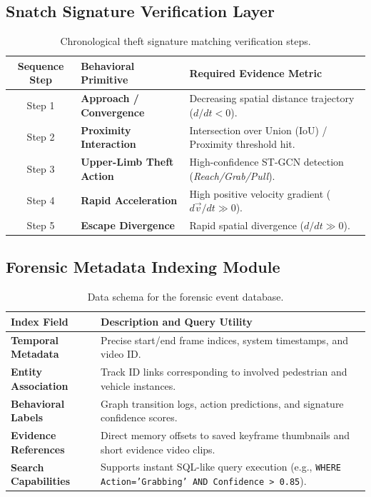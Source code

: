 \documentclass[11pt, a4paper]{article}
\begin{document}
\subsection{Snatch Signature Verification Layer}
\begin{table}[H]
\centering
\small
\renewcommand{\arraystretch}{1.3}
\begin{tabularx}{\textwidth}{|c|>{\hsize=0.35\hsize\bfseries}X|>{\hsize=0.55\hsize}X|}
\hline
\textbf{Sequence Step} & \textbf{Behavioral Primitive} & \textbf{Required Evidence Metric} \\
\hline
Step 1 & Approach / Convergence & Decreasing spatial distance trajectory ($d/dt < 0$). \\
\hline
Step 2 & Proximity Interaction & Intersection over Union (IoU) / Proximity threshold hit. \\
\hline
Step 3 & Upper-Limb Theft Action & High-confidence ST-GCN detection (\textit{Reach/Grab/Pull}). \\
\hline
Step 4 & Rapid Acceleration & High positive velocity gradient ($d\vec{v}/dt \gg 0$). \\
\hline
Step 5 & Escape Divergence & Rapid spatial divergence ($d/dt \gg 0$). \\
\hline
\end{tabularx}
\caption{Chronological theft signature matching verification steps.}
\end{table}

\subsection{Forensic Metadata Indexing Module}
\begin{table}[H]
\centering
\small
\renewcommand{\arraystretch}{1.3}
\begin{tabularx}{\textwidth}{|>{\hsize=0.3\hsize\bfseries}X|>{\hsize=0.7\hsize}X|}
\hline
\textbf{Index Field} & \textbf{Description and Query Utility} \\
\hline
Temporal Metadata & Precise start/end frame indices, system timestamps, and video ID. \\
\hline
Entity Association & Track ID links corresponding to involved pedestrian and vehicle instances. \\
\hline
Behavioral Labels & Graph transition logs, action predictions, and signature confidence scores. \\
\hline
Evidence References & Direct memory offsets to saved keyframe thumbnails and short evidence video clips. \\
\hline
Search Capabilities & Supports instant SQL-like query execution (e.g., \texttt{WHERE Action='Grabbing' AND Confidence > 0.85}). \\
\hline
\end{tabularx}
\caption{Data schema for the forensic event database.}
\end{table}
\end{document}
